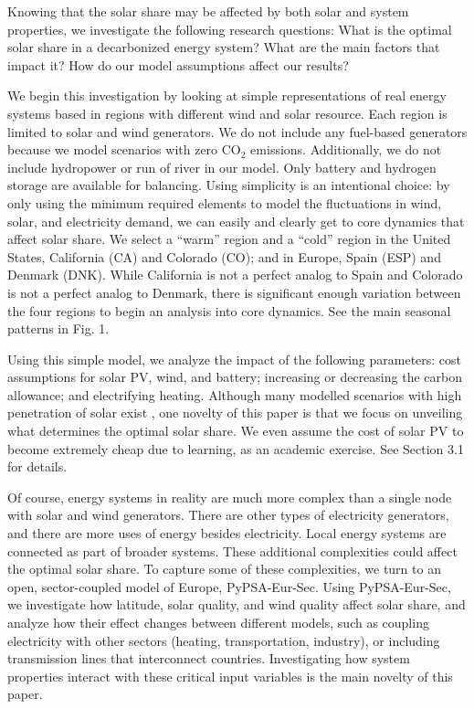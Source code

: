 \documentclass[lettersize,journal]{IEEEtran}
\begin{document}
Knowing that the solar share may be affected by both solar and system properties, we investigate the following research questions: What is the optimal solar share in a decarbonized energy system? What are the main factors that impact it? How do our model assumptions affect our results?

We begin this investigation by looking at simple representations of real energy systems based in regions with different wind and solar resource. Each region is limited to solar and wind generators. We do not include any fuel-based generators because we model scenarios with zero CO$_2$ emissions. Additionally, we do not include hydropower or run of river in our model. Only battery and hydrogen storage are available for balancing. Using simplicity is an intentional choice: by only using the minimum required elements to model the fluctuations in wind, solar, and electricity demand, we can easily and clearly get to core dynamics that affect solar share. We select a “warm” region and a “cold” region in the United States, California (CA) and Colorado (CO); and in Europe, Spain (ESP) and Denmark (DNK). While California is not a perfect analog to Spain and Colorado is not a perfect analog to Denmark, there is significant enough variation between the four regions to begin an analysis into core dynamics. See the main seasonal patterns in Fig. 1. 



Using this simple model, we analyze the impact of the following parameters: cost assumptions for solar PV, wind, and battery; increasing or decreasing the carbon allowance; and electrifying heating. Although many modelled scenarios with high penetration of solar exist \cite{victoria_early_2020, Bogdanov2019, CHILD201980, JACOBSON2017108}, one novelty of this paper is that we focus on unveiling what determines the optimal solar share. We even assume the cost of solar PV to become extremely cheap due to learning, as an academic exercise. See Section 3.1 for details.


Of course, energy systems in reality are much more complex than a single node with solar and wind generators. There are other types of electricity generators, and there are more uses of energy besides electricity. Local energy systems are connected as part of broader systems. These additional complexities could affect the optimal solar share. To capture some of these complexities, we turn to an open, sector-coupled model of Europe, PyPSA-Eur-Sec\cite{pypsa_eur_sec, victoria_speed_2022}. Using PyPSA-Eur-Sec, we investigate how latitude, solar quality, and wind quality affect solar share, and analyze how their effect changes between different models, such as coupling electricity with other sectors (heating, transportation, industry),  or including transmission lines that interconnect countries. Investigating how system properties interact with these critical input variables is the main novelty of this paper.
\end{document}
